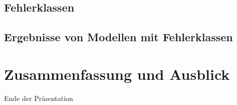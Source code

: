\documentclass{beamer}
\begin{document}
\subsection{Fehlerklassen}
\subsection{Ergebnisse von Modellen mit Fehlerklassen}

\section{Zusammenfassung und Ausblick}

\begin{frame}
\Huge{\centerline{Ende der Präsentation}}
\end{frame}

\end{document}
